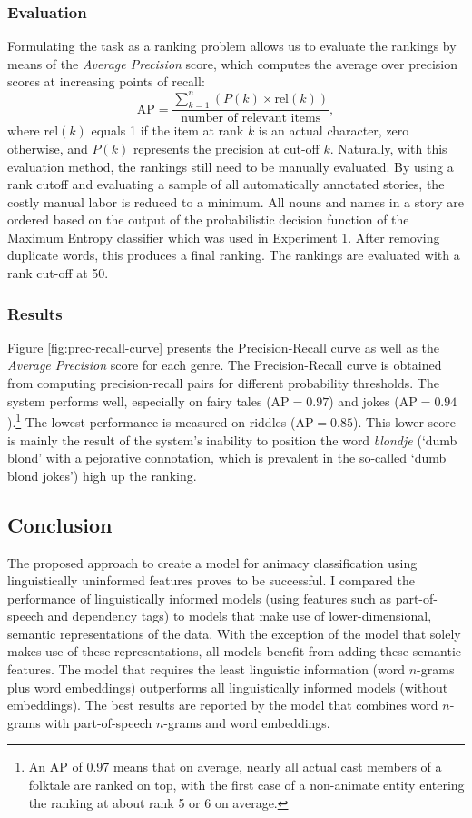 \subsubsection{Evaluation}
Formulating the task as a ranking problem allows us to evaluate the rankings by means of the \emph{Average Precision} score, which computes the average over precision scores at increasing points of recall:
\begin{equation}
\text{AP} = \frac{\sum^n_{k=1} (P(k) \times \text{rel}(k))}{\text{number of relevant items}},
\end{equation}
where $\text{rel}(k)$ equals 1 if the item at rank $k$ is an actual character, zero otherwise, and $P(k)$ represents the precision at cut-off $k$. Naturally, with this evaluation method, the rankings still need to be manually evaluated. By using a rank cutoff and evaluating a sample of all automatically annotated stories, the costly manual labor is reduced to a minimum. All nouns and names in a story are ordered based on the output of the probabilistic decision function of the Maximum Entropy classifier which was used in Experiment 1. After removing duplicate words, this produces a final ranking. The rankings are evaluated with a rank cut-off at 50.

\subsubsection{Results}
Figure \ref{fig:prec-recall-curve} presents the Precision-Recall curve as well as the \emph{Average Precision} score for each genre. The Precision-Recall curve is obtained from computing precision-recall pairs for different probability thresholds. The system performs well, especially on fairy tales ($\text{AP}=0.97$) and jokes ($\text{AP}=0.94$).\footnote{An AP of 0.97 means that on average, nearly all actual cast members of a folktale are ranked on top, with the first case of a non-animate entity entering the ranking at about rank 5 or 6 on average.} The lowest performance is measured on riddles ($\text{AP}=0.85$). This lower score is mainly the result of the system's inability to position the word \emph{blondje} (`dumb blond' with a pejorative connotation, which is prevalent in the so-called `dumb blond jokes') high up the ranking.

\subsection{Conclusion}

The proposed approach to create a model for animacy classification using linguistically uninformed features proves to be successful. I compared the performance of linguistically informed models (using features such as part-of-speech and dependency tags) to models that make use of lower-dimensional, semantic representations of the data. With the exception of the model that solely makes use of these representations, all models benefit from adding these semantic features. The model that requires the least linguistic information (word $n$-grams plus word embeddings) outperforms all linguistically informed models (without embeddings). The best results are reported by the model that combines word $n$-grams with part-of-speech $n$-grams and word embeddings.

